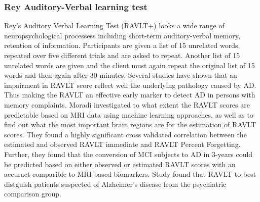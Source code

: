 \documentclass[12pt, twoside, a4paper]{article}
\begin{document}
\subsubsection{Rey Auditory-Verbal learning test}
Rey's Auditory Verbal Learning Test (RAVLT+) looks a wide range of neuropsychological processess including short-term auditory-verbal memory, retention of information. Participants are given a list of 15 unrelated words, repeated over five different trials and are asked to repeat. Another list of 15 unrelated words are given and the client must again repeat the original list of 15 words and then again after 30 minutes. 
Several studies have shown that an impairment in RAVLT score reflect well the underlying pathology caused by AD. Thus making the RAVLT an effective early marker to detect AD in persons with memory complaints. Moradi investigated to what extent the RAVLT scores are predictable based on MRI data using machine learning approaches, as well as to find out what the most important brain regions are for the estimation of RAVLT scores. They found a highly significant cross validated correlation between the estimated and observed RAVLT immediate and RAVLT Percent Forgetting. Further, they found that the conversion of MCI subjects to AD in 3-years could be predicted based on either observed or estimated RAVLT scores with an accuract comparible to MRI-based biomarkers.
Study found that RAVLT to best distguish patients suspected of Alzheimer's disease from the psychiatric comparison group.
\end{document}
